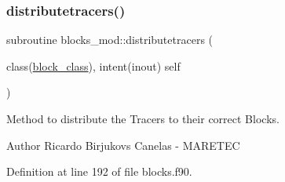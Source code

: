 \subsubsection{\texorpdfstring{distributetracers()}{distributetracers()}}
{\footnotesize\ttfamily subroutine blocks\+\_\+mod\+::distributetracers (\begin{DoxyParamCaption}\item[{class(\mbox{\hyperlink{structblocks__mod_1_1block__class}{block\+\_\+class}}), intent(inout)}]{self }\end{DoxyParamCaption})\hspace{0.3cm}{\ttfamily [private]}}



Method to distribute the Tracers to their correct Blocks. 

\begin{DoxyAuthor}{Author}
Ricardo Birjukovs Canelas -\/ M\+A\+R\+E\+T\+EC 
\end{DoxyAuthor}


Definition at line 192 of file blocks.\+f90.


